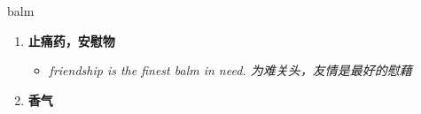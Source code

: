
\begin{frame}
{\huge balm}
\begin{center}
\begin{enumerate}\Large
  \item \textbf{止痛药，安慰物}
  \begin{itemize}
    \item \em{\Large{friendship is the finest balm in need. 为难关头，友情是最好的慰藉}}
  \end{itemize}
  \item \textbf{香气}
\end{enumerate}
\end{center}
\end{frame}
